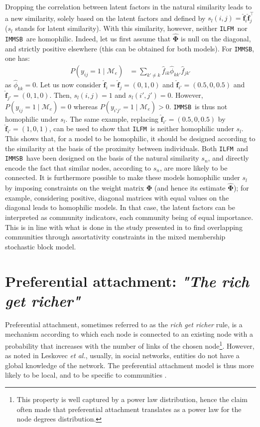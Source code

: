 \documentclass[journal]{IEEEtran}
\newcommand{\ifm}{\texttt{ILFM}}
\newcommand{\imb}{\texttt{IMMSB}}
\newcommand{\pr}{P}
\newcommand{\M}{\mathcal{M}}
\newcommand{\mat}[1]{\mathbf{#1}}
\begin{document}
Dropping the correlation between latent factors in the natural similarity leads to a new similarity, solely based on the latent factors and defined by $s_l(i,j) = \mat{\hat{f}}_{i} \mat{\hat{f}}_j^\top \nonumber$ ($s_l$ stands for latent similarity). With this similarity, however, neither \ifm\  nor \imb\ are homophilic. Indeed, let us first assume that $\mat{\hat{\Phi}}$ is null on the diagonal, and strictly positive elsewhere (this can be obtained for both models). For \imb, one has:
%
\begin{align}
\pr(y_{ij}=1 \mid \M_e) & = \sum_{k' \neq k} \hat{f}_{ik} \hat{\phi}_{kk'} \hat{f}_{jk'} \nonumber 
\end{align}
%
as $\hat{\phi}_{kk} = 0$. Let us now consider $\mat{\hat{f}}_i=\mat{\hat{f}}_j=(0,1,0)$ and $\mat{\hat{f}}_{i'}=(0.5,0,0.5)$ and $\mat{\hat{f}}_{j'}=(0,1,0)$. Then, $s_l(i,j)=1$ and $s_l(i',j')=0$. However, $\pr(y_{ij}=1 \mid \M_e) = 0$ whereas $\pr(y_{i'j'}=1 \mid \M_e) > 0$. \imb\ is thus not homophilic under $s_l$. The same example, replacing $\mat{\hat{f}}_{i'}=(0.5,0,0.5)$ by $\mat{\hat{f}}_{i'}=(1,0,1)$, can be used to show that \ifm\ is neither homophilic under $s_l$.~\\

This shows that, for a model to be homophilic, it should be designed according to the similarity at the basis of the proximity between individuals. Both \ifm\ and \imb\ have been designed on the basis of the natural similarity $s_n$, and directly encode the fact that similar nodes, according to $s_n$, are more likely to be connected.  It is furthermore possible to make these models homophilic under $s_l$ by imposing constraints on the weight matrix $\mat{\Phi}$ (and hence its estimate $\mat{\hat{\Phi}}$); for example, considering positive, diagonal matrices with equal values on the diagonal leads to homophilic models. In that case, the latent factors can be interpreted as community indicators, each community being of equal importance. This is in line with what is done in the study presented in \cite{AMMSB} to find overlapping communities through assortativity constraints in the mixed membership stochastic block model.

\section{Preferential attachment: \emph{"The rich get richer"}}
\label{sec:burstiness}

Preferential attachment, sometimes referred to as the \textit{rich get richer} rule, is a mechanism according to which each node is connected to an existing node with a probability that increases with the number of links of the chosen node\footnote{This property is well captured by a power law distribution, hence the claim often made that preferential attachment translates as a power law for the node degrees distribution.}. However, as noted in Leskovec \textit{et al.}, usually, in social networks, entities do not have a global knowledge of the network. The preferential attachment model is thus more likely to be local, and to be specific to communities \cite{LeskovecBKT08}.~\\
\end{document}
